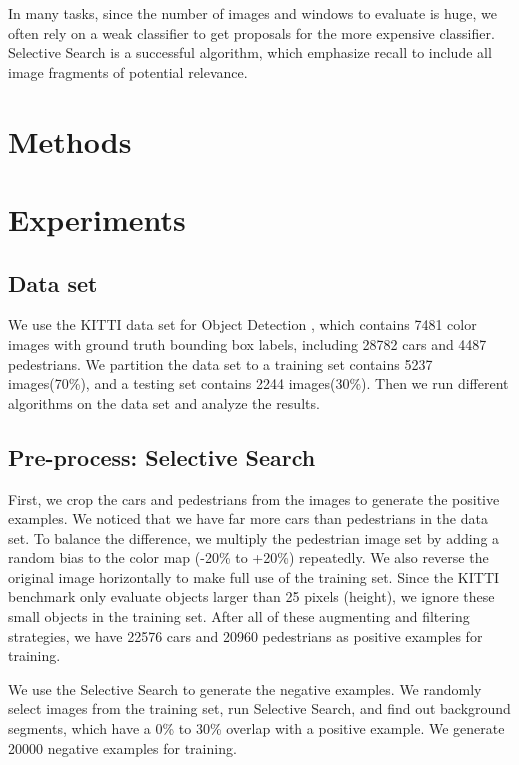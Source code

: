 \documentclass{article} %
\begin{document}
In many tasks, since the number of images and windows to evaluate is huge, we often rely on a weak classifier to get proposals for the more expensive classifier. Selective Search \cite{van2011segmentation} is a successful algorithm, which emphasize recall to include all image fragments of potential relevance. 

\section{Methods}

\section{Experiments}

\subsection{Data set}

We use the KITTI data set for Object Detection \cite{Geiger2012CVPR}, which contains 7481 color images with ground truth bounding box labels, including 28782 cars and 4487 pedestrians. We partition the data set to a training set contains 5237 images(70\%), and a testing set contains 2244 images(30\%). Then we run different algorithms on the data set and analyze the results.

\subsection{Pre-process: Selective Search}
\label{sec:preprocess}

First, we crop the cars and pedestrians from the images to generate the positive examples. We noticed that we have far more cars than pedestrians in the data set. To balance the difference, we multiply the pedestrian image set by adding a random bias to the color map (-20\% to +20\%) repeatedly. We also reverse the original image horizontally to make full use of the training set. Since the KITTI benchmark only evaluate objects larger than 25 pixels (height), we ignore these small objects in the training set. After all of these augmenting and filtering strategies, we have 22576 cars and 20960 pedestrians as positive examples for training.

We use the Selective Search \cite{van2011segmentation} to generate the negative examples. We randomly select images from the training set, run Selective Search, and find out background segments, which have a 0\% to 30\% overlap with a positive example. We generate 20000 negative examples for training. 
\end{document}
